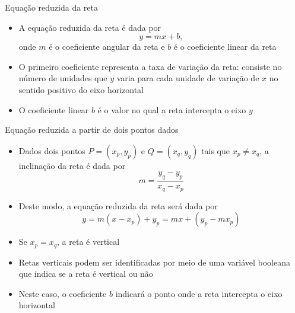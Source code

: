 \begin{frame}[fragile]{Equação reduzida da reta}

    \begin{itemize}
        \item A equação reduzida da reta é dada por
        \[
            y = mx + b,
        \]
        onde $m$ é o coeficiente angular da reta e $b$ é o coeficiente linear da reta
        \pause

        \item O primeiro coeficiente representa a taxa de variação da reta: consiste no número de 
        unidades que $y$ varia para cada unidade de variação de $x$ no sentido positivo do eixo horizontal
        \pause

        \item O coeficiente linear $b$ é o valor no qual a reta intercepta o eixo $y$
        \pause


    \end{itemize}

\end{frame}

\begin{frame}[fragile]{Equação reduzida a partir de dois pontos dados}

    \begin{itemize}
        \item Dados dois pontos $P = (x_p, y_p)$ e $Q = (x_q, y_q)$ tais que $x_p \neq x_q$, 
        a inclinação da reta é dada por
        \[
            m = \frac{y_q - y_p}{x_q - x_p}
        \]
        \pause

        \item Deste modo, a equação reduzida da reta será dada por
        \[
            y = m(x - x_p) + y_p = mx + (y_p - mx_p)
        \]
        \pause

        \item Se $x_p = x_q$, a reta é vertical
        \pause


        \item Retas verticais podem ser identificadas por meio de uma variável booleana que indica
            se a reta é vertical ou não
        \pause

        \item Neste caso, o coeficiente $b$ indicará o ponto onde a reta intercepta o eixo horizontal
    \end{itemize}

\end{frame}

